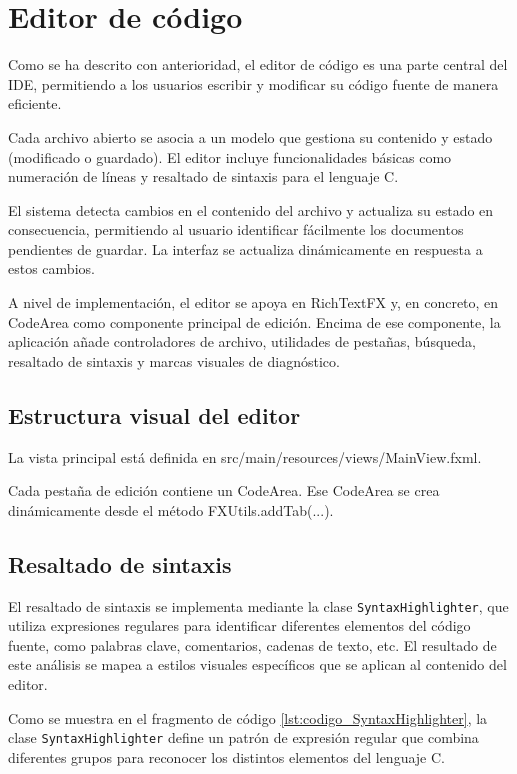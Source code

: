 \documentclass[../../main.tex]{subfiles}
\begin{document}
\section{Editor de código}

Como se ha descrito con anterioridad, el editor de código es una parte central del IDE, permitiendo a los usuarios escribir y modificar su código fuente de manera eficiente.

Cada archivo abierto se asocia a un modelo que gestiona su contenido y estado (modificado o guardado). El editor incluye funcionalidades básicas como numeración de líneas y resaltado de sintaxis para el lenguaje C.

El sistema detecta cambios en el contenido del archivo y actualiza su estado en consecuencia, permitiendo al usuario identificar fácilmente los documentos pendientes de guardar. La interfaz se actualiza dinámicamente en respuesta a estos cambios.

A nivel de implementación, el editor se apoya en RichTextFX y, en concreto, en CodeArea como componente principal de edición. Encima de ese componente, la aplicación añade controladores de archivo, utilidades de pestañas, búsqueda, resaltado de sintaxis y marcas visuales de diagnóstico.

\subsection{Estructura visual del editor}

La vista principal está definida en src/main/resources/views/MainView.fxml.

Cada pestaña de edición contiene un CodeArea. Ese CodeArea se crea dinámicamente desde el método FXUtils.addTab(...).

\clearpage

\subsection{Resaltado de sintaxis} 

El resaltado de sintaxis se implementa mediante la clase \lstinline|SyntaxHighlighter|, que utiliza expresiones regulares para identificar diferentes elementos del código fuente, como palabras clave, comentarios, cadenas de texto, etc. El resultado de este análisis se mapea a estilos visuales específicos que se aplican al contenido del editor. 

Como se muestra en el fragmento de código \ref{lst:codigo_SyntaxHighlighter}, la clase \lstinline|SyntaxHighlighter| define un patrón de expresión regular que combina diferentes grupos para reconocer los distintos elementos del lenguaje C.
\end{document}
